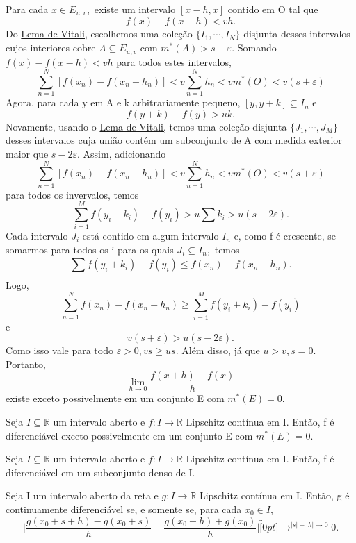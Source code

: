 \documentclass[Analysis/analysis_notes.tex]{subfiles}
\begin{document}
\begin{proof*}
	Para cada \(x\in E_{u, v},\) existe um intervalo \([x-h, x]\) contido em O tal que
	\[
		f(x) - f(x-h) < vh.
	\]
	Do \hyperlink{vitali_covering}{Lema de Vitali,} escolhemos uma cole\c cão \(\{I_{1}, \cdots, I_{N}\} \)
	disjunta desses intervalos cujos interiores cobre \(A\subseteq{E_{u, v}}\) com
	\(m^{*}(A) > s-\varepsilon .\) Somando \(f(x) - f(x-h) < vh\) para todos estes intervalos,
	\[
		\sum\limits_{n=1}^{N}[f(x_{n}) - f(x_{n}-h_{n})] < v \sum\limits_{n=1}^{N}h_{n} < vm^{*}(O) < v(s+\varepsilon )
	\]
	Agora, para cada y em A e k arbitrariamente pequeno, \([y, y+k]\subseteq{I_{n}}\) e
	\[
		f(y+k)-f(y) > uk.
	\]
	Novamente, usando o \hyperlink{vitali_covering}{Lema de Vitali,} temos uma cole\c cão
	disjunta \(\{J_{1}, \cdots, J_{M}\}\) desses intervalos cuja união contém um
	subconjunto de A com medida exterior maior que \(s-2\varepsilon .\) Assim,
	adicionando
	\[
		\sum\limits_{n=1}^{N}[f(x_{n}) - f(x_{n}-h_{n})] < v \sum\limits_{n=1}^{N}h_{n} < vm^{*}(O) < v(s+\varepsilon )
	\]
	para todos os invervalos, temos
	\[
		\sum\limits_{i=1}^{M}f(y_{i}-k_{i})-f(y_{i}) > u\sum k_{i} > u (s-2\varepsilon ).
	\]
	Cada intervalo \(J_{i}\) está contido em algum intervalo \(I_{n}\) e, como f é
	crescente, se somarmos para todos os i para os quais \(J_{i}\subseteq{I_{n}},\) temos
	\[
		\sum\limits_{}^{}f(y_{i}+k_{i}) - f(y_{i})\leq f(x_{n}) - f(x_{n}-h_{n}).
	\]
	Logo,
	\[
		\sum\limits_{n=1}^{N}f(x_{n})-f(x_{n}-h_{n})\geq \sum\limits_{i=1}^{M}f(y_{i}+k_{i}) - f(y_{i})
	\]
	e
	\[
		v(s+\varepsilon ) > u(s-2\varepsilon ).
	\]
	Como isso vale para todo \(\varepsilon >0, vs\geq us.\) Além disso, já que
	\(u > v, s=0.\) Portanto,
	\[
		\lim_{h\to 0}\frac{f(x+h)-f(x)}{h}
	\]
	existe exceto possivelmente em um conjunto E com \(m^{*}(E) = 0.\) \qedsymbol
\end{proof*}
\begin{crl*}
	Seja \(I\subseteq{\mathbb{R}}\) um intervalo aberto e \(f:I\rightarrow \mathbb{R}\) Lipschitz contínua em I.
	Então, f é diferenciável exceto possivelmente em um conjunto E com \(m^{*}(E) = 0.\)
\end{crl*}
\begin{crl*}
	Seja \(I\subseteq{\mathbb{R}}\) um intervalo aberto e \(f:I\rightarrow \mathbb{R}\) Lipschitz contínua em I. Então, f é diferenciável em um
	subconjunto denso de I.
\end{crl*}
\begin{theorem*}
	Seja I um intervalo aberto da reta e \(g:I\rightarrow \mathbb{R}\) Lipschitz contínua
	em I. Então, g é continuamente diferenciável se, e somente se, para cada \(x_{0}\in I,\)
	\[
		\biggl|\frac{g(x_{0}+s+h)-g(x_{0}+s)}{h}-\frac{g(x_{0}+h)+g(x_{0})}{h}\biggr|\overbracket[0pt]{\longrightarrow}^{|s|+|h|\to 0}0.
	\]
\end{theorem*}
\end{document}
